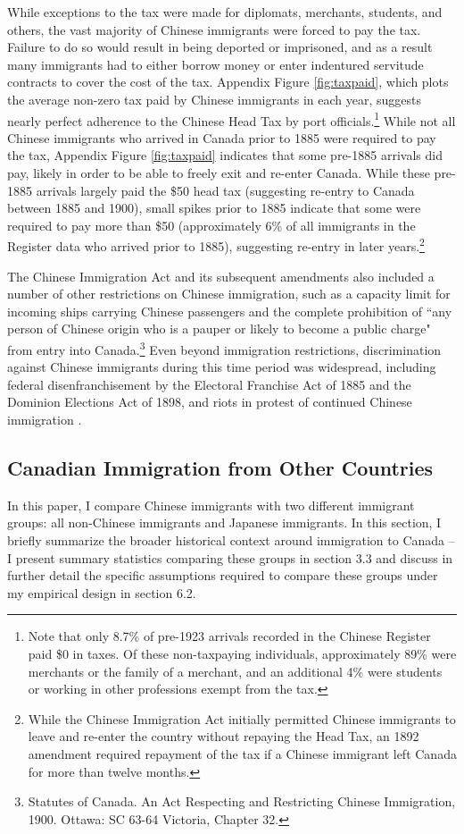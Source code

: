 While exceptions to the tax were made for diplomats, merchants, students, and others, the vast majority of Chinese immigrants were forced to pay the tax. Failure to do so would result in being deported or imprisoned, and as a result many immigrants had to either borrow money or enter indentured servitude contracts to cover the cost of the tax. Appendix Figure \ref{fig:taxpaid}, which plots the average non-zero tax paid by Chinese immigrants in each year, suggests nearly perfect adherence to the Chinese Head Tax by port officials.\footnote{Note that only 8.7\% of pre-1923 arrivals recorded in the Chinese Register paid \$0 in taxes. Of these non-taxpaying individuals, approximately 89\% were merchants or the family of a merchant, and an additional 4\% were students or working in other professions exempt from the tax.} 
While not all Chinese immigrants who arrived in Canada prior to 1885 were required to pay the tax, Appendix Figure \ref{fig:taxpaid} indicates that some pre-1885 arrivals did pay, likely in order to be able to freely exit and re-enter Canada. While these pre-1885 arrivals largely paid the \$50 head tax (suggesting re-entry to Canada between 1885 and 1900), small spikes prior to 1885 indicate that some were required to pay more than \$50 (approximately 6\% of all immigrants in the Register data who arrived prior to 1885), suggesting re-entry in later years.\footnote{While the Chinese Immigration Act initially permitted Chinese immigrants to leave and re-enter the country without repaying the Head Tax, an 1892 amendment required repayment of the tax if a Chinese immigrant left Canada for more than twelve months.} 

The Chinese Immigration Act and its subsequent amendments also included a number of other restrictions on Chinese immigration, such as a capacity limit for incoming ships carrying Chinese passengers and the complete prohibition of ``any person of Chinese origin who is a pauper or likely to become a public charge" from entry into Canada.\footnote{Statutes of Canada. An Act Respecting and Restricting Chinese Immigration, 1900. Ottawa: SC 63-64 Victoria, Chapter 32.}
Even beyond immigration restrictions, discrimination against Chinese immigrants during this time period was widespread, including federal disenfranchisement by the Electoral Franchise Act of 1885 and the Dominion Elections Act of 1898, and riots in protest of continued Chinese immigration \citep{pier21context}.

\subsection{Canadian Immigration from Other Countries}
In this paper, I compare Chinese immigrants with two different immigrant groups: all non-Chinese immigrants and Japanese immigrants. In this section, I briefly summarize the broader historical context around immigration to Canada -- I present summary statistics comparing these groups in section 3.3 and discuss in further detail the specific assumptions required to compare these groups under my empirical design in section 6.2.

